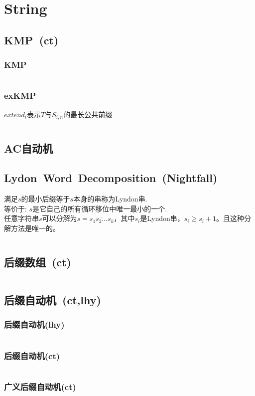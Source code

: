 \chapter{String}
\section{KMP\ \small(ct)}
	\subsection*{KMP}
		\inputminted{cpp}{String/kmp.cpp}
	\subsection*{exKMP}
		$ extend_i $表示$ T $与$ S_{i,n} $的最长公共前缀
		\inputminted{cpp}{String/ex_kmp.cpp}
\section{AC自动机}
\section{Lydon\ Word\ Decomposition\ \small(Nightfall)}
	满足$ s $的最小后缀等于$ s $本身的串称为Lyndon串.
	\\等价于: $ s $是它自己的所有循环移位中唯一最小的一个.
	\\任意字符串$ s $可以分解为$ s = \overline{s_1 s_2 \dots s_k} $，其中$ s_i $是Lyndon串，$ s_i \geq s_i + 1 $。且这种分解方法是唯一的。
	\inputminted{cpp}{String/lydon.cpp}
\section{后缀数组\ \small(ct)}
	\inputminted{cpp}{String/suffix_array.cpp}
\section{后缀自动机\ \small(ct,lhy)}
	\subsection*{后缀自动机(lhy)}
		\inputminted{cpp}{String/suffix_automaton.cpp}
	\subsection*{后缀自动机(ct)}
		\inputminted{cpp}{String/suffix_automaton.cpp}
	\subsection*{广义后缀自动机(ct)}
		\inputminted{cpp}{String/general_suffix_automaton.cpp}
